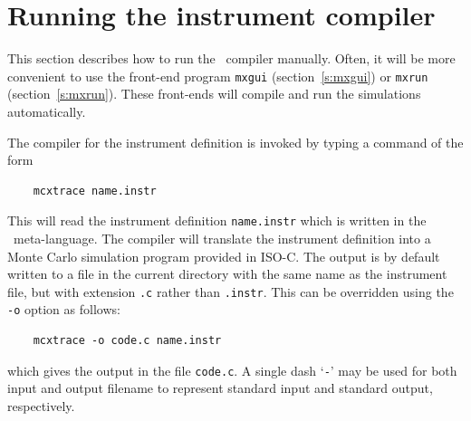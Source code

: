 %

\section{Running the instrument compiler}
\label{s:running}

This section describes how to run the \MCX\ compiler manually. Often,
it will be more convenient to use the front-end program \verb+mxgui+
(section~\ref{s:mxgui}) or \verb+mxrun+ (section~\ref{s:mxrun}). These
front-ends will compile and run the simulations automatically.
 

The compiler for the \MCX{} instrument definition
is invoked by typing a command of the form
\begin{verbatim}
    mcxtrace name.instr
\end{verbatim}
This will read the instrument definition \verb+name.instr+ which is
written in the \MCX\ meta-language. The compiler will translate the
instrument definition into a Monte Carlo simulation program provided in
ISO-C. The output is by default written to a file in the current
directory with the same name as the instrument file, but with extension
\verb+.c+ rather than \verb+.instr+. This can be overridden using the
\verb+-o+ option as follows:
\begin{verbatim}
    mcxtrace -o code.c name.instr
\end{verbatim}
which gives the output in the file \verb+code.c+.
A single dash `\verb+-+' may be used for both input and output filename
to represent standard input and standard output, respectively.



